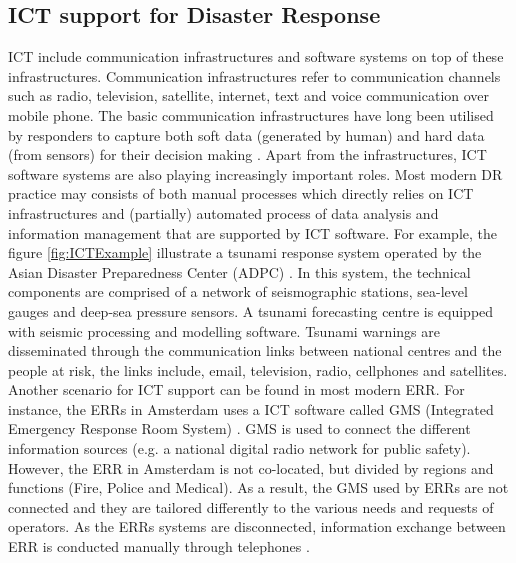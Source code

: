 \subsection{ICT support for Disaster Response}
\acf{ICT} include communication infrastructures and software systems on top of these infrastructures. Communication infrastructures refer to communication channels such as radio, television, satellite, internet, text and voice communication over mobile phone. The basic communication infrastructures have long been utilised by responders to capture both soft data (generated by human) and hard data (from sensors) for their decision making \citep{Fischer2012}. Apart from the infrastructures, \ac{ICT} software systems are also playing increasingly important roles. Most modern DR practice may consists  of both manual processes which directly relies on \ac{ICT} infrastructures and (partially) automated process of data analysis and information management that are supported by \ac{ICT} software. For example, the figure \ref{fig:ICTExample} illustrate a tsunami response system operated by the Asian Disaster Preparedness Center (ADPC) \citep{Wattegama2012}. In this system,  the technical components are comprised of a network of seismographic stations, sea-level gauges and deep-sea pressure sensors. A tsunami forecasting centre is equipped with seismic processing and modelling software.  Tsunami warnings are disseminated through the communication links between national centres and the people at risk, the links include, email, television, radio, cellphones and satellites. Another scenario for \ac{ICT} support can be found in most modern \acf{ERR}. For instance, the \ac{ERR}s in Amsterdam uses a \ac{ICT} software called GMS (Integrated Emergency Response Room System) \citep{Boersma2009}. GMS is used to connect the different information sources (e.g. a national digital radio network for public safety). However, the \ac{ERR} in Amsterdam is not co-located, but divided by regions and functions (Fire, Police and Medical). As a result, the GMS used by \ac{ERR}s are not connected and they are tailored differently to the various needs and requests of operators. As the \acf{ERR}s systems are disconnected, information exchange between \ac{ERR} is conducted manually through telephones \citep{Boersma2009}.\\


